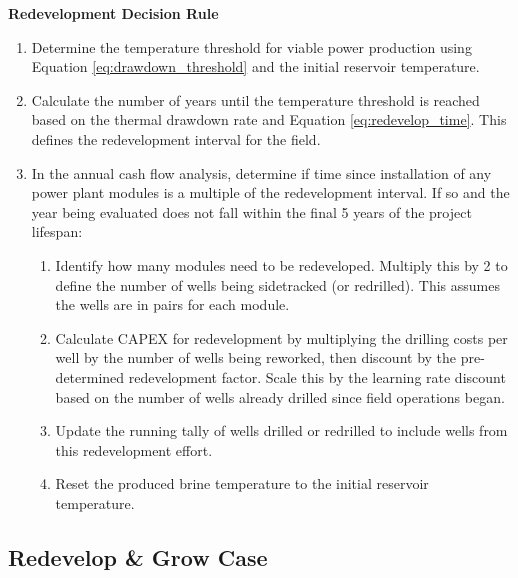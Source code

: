 \noindent\textbf{Redevelopment Decision Rule}\label{ch4:dr_redevelop}
\begin{enumerate}
	\item Determine the temperature threshold for viable power production using Equation \ref{eq:drawdown_threshold} and the initial reservoir temperature.
	\item Calculate the number of years until the temperature threshold is reached based on the thermal drawdown rate and Equation \ref{eq:redevelop_time}. This defines the redevelopment interval for the field.
    \item In the annual cash flow analysis, determine if time since installation of any power plant modules is a multiple of the redevelopment interval. If so and the year being evaluated does not fall within the final 5 years of the project lifespan:
	\begin{enumerate}
	    \item Identify how many modules need to be redeveloped. Multiply this by 2 to define the number of wells being sidetracked (or redrilled). This assumes the wells are in pairs for each module.
	    \item Calculate CAPEX for redevelopment by multiplying the drilling costs per well by the number of wells being reworked, then discount by the pre-determined redevelopment factor. Scale this by the learning rate discount based on the number of wells already drilled since field operations began.
	    \item Update the running tally of wells drilled or redrilled to include wells from this redevelopment effort.
	    \item Reset the produced brine temperature to the initial reservoir temperature.
    \end{enumerate}
\end{enumerate}

\subsection{Redevelop \& Grow Case}\label{ch4:flex_grow_case}

